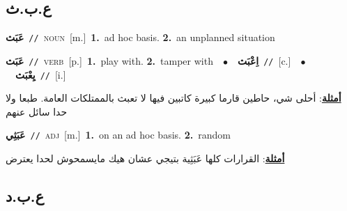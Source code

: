 \documentclass[10pt,a4paper,twoside]{article} %
\begin{document}
\begin{multicols}{2}
\vspace{-3mm}
\subsection*{\color{blue}\foreignlanguage{arabic}{ع.ب.ث}\color{blue}{}} 

{\setlength\topsep{0pt}\textbf{\foreignlanguage{arabic}{عَبَث}}\ {\color{gray}\texttt{//}\color{black}}\ \textsc{noun}\ [m.]\ \textbf{1.}~ad hoc basis.  \textbf{2.}~an unplanned situation\ } \vspace{2mm}

{\setlength\topsep{0pt}\textbf{\foreignlanguage{arabic}{عَبَث}}\ {\color{gray}\texttt{//}\color{black}}\ \textsc{verb}\ [p.]\ \textbf{1.}~play with.  \textbf{2.}~tamper with\ \ $\bullet$\ \ \setlength\topsep{0pt}\textbf{\foreignlanguage{arabic}{اِعْبَث}}\ {\color{gray}\texttt{//}\color{black}}\ [c.]\ \ $\bullet$\ \ \setlength\topsep{0pt}\textbf{\foreignlanguage{arabic}{يِعْبَث}}\ {\color{gray}\texttt{//}\color{black}}\ [i.]\  \begin{flushright}\color{gray}\foreignlanguage{arabic}{\textbf{\underline{\foreignlanguage{arabic}{أمثلة}}}: أحلى شي، حاطين قارما كبيرة كاتبين فيها لا تعبث بالممتلكات العامة. طبعا ولا حدا سائل عنهم}\end{flushright}\color{black}} \vspace{2mm}

{\setlength\topsep{0pt}\textbf{\foreignlanguage{arabic}{عَبَثِي}}\ {\color{gray}\texttt{//}\color{black}}\ \textsc{adj}\ [m.]\ \textbf{1.}~on an ad hoc basis.  \textbf{2.}~random\  \begin{flushright}\color{gray}\foreignlanguage{arabic}{\textbf{\underline{\foreignlanguage{arabic}{أمثلة}}}: القرارات كلها عَبَثِية بتيجي عشان هيك مايسمحوش لحدا يعترض}\end{flushright}\color{black}} \vspace{2mm}

\vspace{-3mm}
\subsection*{\color{blue}\foreignlanguage{arabic}{ع.ب.د}\color{blue}{}} 


\end{multicols}
\end{document}
